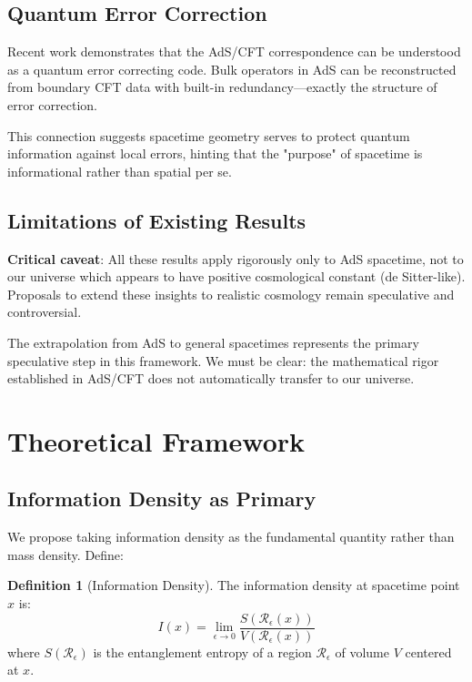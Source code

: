 \documentclass[12pt,twocolumn]{article}
\theoremstyle{definition}
\newtheorem{definition}[theorem]{Definition}
\theoremstyle{remark}
\begin{document}
\subsection{Quantum Error Correction}

Recent work \cite{Almheiri2015,Pastawski2015} demonstrates that the AdS/CFT correspondence can be understood as a quantum error correcting code. Bulk operators in AdS can be reconstructed from boundary CFT data with built-in redundancy—exactly the structure of error correction.

This connection suggests spacetime geometry serves to protect quantum information against local errors, hinting that the "purpose" of spacetime is informational rather than spatial per se.

\subsection{Limitations of Existing Results}

\textbf{Critical caveat}: All these results apply rigorously only to AdS spacetime, not to our universe which appears to have positive cosmological constant (de Sitter-like). Proposals to extend these insights to realistic cosmology \cite{Susskind2021} remain speculative and controversial.

The extrapolation from AdS to general spacetimes represents the primary speculative step in this framework. We must be clear: the mathematical rigor established in AdS/CFT does not automatically transfer to our universe.

\section{Theoretical Framework}

\subsection{Information Density as Primary}

We propose taking information density as the fundamental quantity rather than mass density. Define:

\begin{definition}[Information Density]
The information density at spacetime point $x$ is:
\begin{equation}
I(x) = \lim_{\epsilon \to 0} \frac{S(\mathcal{R}_\epsilon(x))}{V(\mathcal{R}_\epsilon(x))}
\end{equation}
where $S(\mathcal{R}_\epsilon)$ is the entanglement entropy of a region $\mathcal{R}_\epsilon$ of volume $V$ centered at $x$.
\end{definition}
\end{document}
